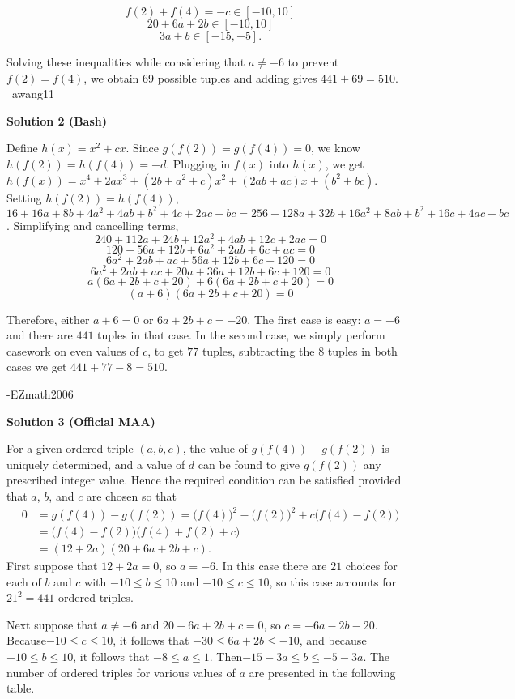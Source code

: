\begin{enumerate}
 
 \[f(2)+f(4) = -c \in [-10,10]\]
 \[20 + 6a + 2b \in [-10,10]\]
 \[3a + b \in [-15,-5].\]

 Solving these inequalities while considering that $a \neq -6$ to prevent $f(2) = f(4)$, we obtain $69$ possible tuples and adding gives $441+69=\boxed{510}$. ~awang11

 



\textbf{Solution 2 (Bash)}

Define $h(x)=x^2+cx$. Since $g(f(2))=g(f(4))=0$, we know $h(f(2))=h(f(4))=-d$. Plugging in $f(x)$ into $h(x)$, we get $h(f(x))=x^4+2ax^3+(2b+a^2+c)x^2+(2ab+ac)x+(b^2+bc)$. Setting $h(f(2))=h(f(4))$, 
 \[16+16a+8b+4a^2+4ab+b^2+4c+2ac+bc=256+128a+32b+16a^2+8ab+b^2+16c+4ac+bc\]. Simplifying and cancelling terms, 
 \[240+112a+24b+12a^2+4ab+12c+2ac=0\] 
 \[120+56a+12b+6a^2+2ab+6c+ac=0\] 
 \[6a^2+2ab+ac+56a+12b+6c+120=0\] 
 \[6a^2+2ab+ac+20a+36a+12b+6c+120=0\] 
 \[a(6a+2b+c+20)+6(6a+2b+c+20)=0\] 
 \[(a+6)(6a+2b+c+20)=0\]

 Therefore, either $a+6=0$ or $6a+2b+c=-20$. The first case is easy: $a=-6$ and there are $441$ tuples in that case. In the second case, we simply perform casework on even values of $c$, to get $77$ tuples, subtracting the $8$ tuples in both cases we get $441+77-8=\boxed{510}$.

 -EZmath2006

 



\textbf{Solution 3 (Official MAA)}

For a given ordered triple $(a, b, c)$, the value of $g(f(4)) - g(f(2))$ is uniquely determined, and a value of $d$ can be found to give $g(f(2))$ any prescribed integer value. Hence the required condition can be satisfied provided that $a$, $b$, and $c$ are chosen so that
 \begin{align*} 0 &= g(f(4)) - g(f(2)) = \big(f(4)\big)^{\!2} - \big(f(2)\big)^{\!2} + c\big(f(4) - f(2)\big)\\ &= \big(f(4) - f(2)\big)\big(f(4) + f(2) + c\big)\\ &= (12 + 2a)(20 + 6a + 2b + c). \end{align*}
First suppose that $12 + 2a = 0$, so $a = -6$. In this case there are $21$ choices for each of $b$ and $c$ with $-10 \le b \le 10$ and $-10 \le c \le 10$, so this case accounts for $21^2 = 441$ ordered triples.

 Next suppose that $a \ne -6$ and $20 + 6a + 2b + c = 0$, so $c = -6a - 2b - 20$. Because$-10 \le c \le 10$, it follows that $-30 \le 6a + 2b \le -10$, and because $-10\le b \le10$, it follows that $-8 \le a \le 1$. Then$-15 - 3a \le b \le -5 - 3a$. The number of ordered triples for various values of $a$ are presented in the following table.


\end{enumerate}
